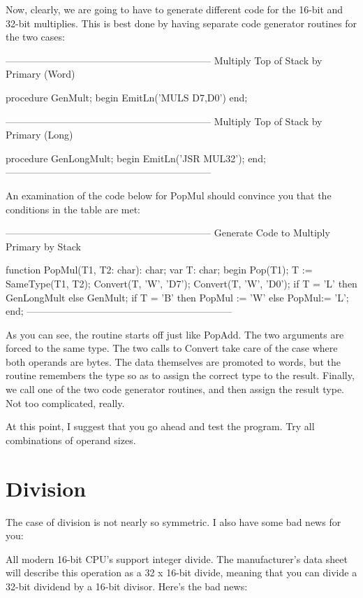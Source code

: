 \documentclass[float=false, crop=false]{standalone}
\begin{document}
Now, clearly, we are going to have to generate different code for the 16-bit and
32-bit multiplies. This is best done by having separate code generator routines
for the two cases:


{---------------------------------------------------------------}
{ Multiply Top of Stack by Primary (Word) }

procedure GenMult;
begin
   EmitLn('MULS D7,D0')
end;


{---------------------------------------------------------------}
{ Multiply Top of Stack by Primary (Long) }

procedure GenLongMult;
begin
   EmitLn('JSR MUL32');
end;
{---------------------------------------------------------------}


An examination of the code below for PopMul should convince you that the
conditions in the table are met:


{---------------------------------------------------------------}
{ Generate Code to Multiply Primary by Stack }

function PopMul(T1, T2: char): char;
var T: char;
begin
   Pop(T1);
   T := SameType(T1, T2);
   Convert(T, 'W', 'D7');
   Convert(T, 'W', 'D0');
   if T = 'L' then
      GenLongMult
   else
      GenMult;
   if T = 'B' then
      PopMul := 'W'
   else
      PopMul:= 'L';
end;
{---------------------------------------------------------------}


As you can see, the routine starts off just like PopAdd. The two arguments are
forced to the same type. The two calls to Convert take care of the case where
both operands are bytes. The data themselves are promoted to words, but the
routine remembers the type so as to assign the correct type to the result.
Finally, we call one of the two code generator routines, and then assign the
result type. Not too complicated, really.

At this point, I suggest that you go ahead and test the program. Try all
combinations of operand sizes.


\section{Division}

The case of division is not nearly so symmetric. I also have some bad news for
you:

All modern 16-bit CPU's support integer divide. The manufacturer's data sheet
will describe this operation as a 32 x 16-bit divide, meaning that you can
divide a 32-bit dividend by a 16-bit divisor. Here's the bad news:
\end{document}

